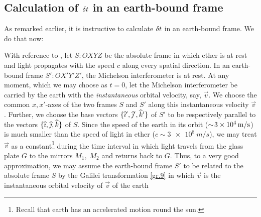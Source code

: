\subsection{Calculation of {${\delta} t$} in 
an earth-bound frame}
As remarked earlier, it is instructive to calculate ${\delta} t$ 
in an earth-bound frame. We do that now:
\begin{figure}[H]
\centering
{}
\caption{}\label{fig3.3}
\end{figure}
With reference to , let $S:OXYZ$ be the 
absolute frame in which ether is at rest and light 
propagates with the speed $c$ along every spatial direction. 
In an earth-bound frame $S':OX'Y'Z'$, the Michelson 
interferometer is at rest. At any moment, which we may 
choose as $t=0$, let the Michelson interferometer be carried 
by the earth with the \textsl{instantaneous} orbital 
velocity, say, $\vec{v}$. We choose the common $x,x'$-axes 
of the two frames $S$ and $S'$ along this  instantaneous 
velocity $\vec{v}$. Further, we choose the base vectors 
$\{{\widehat{\imath}}',{\widehat{\jmath}}',{\widehat{k}}'\}$ of $S'$ to be respectively parallel 
to the vectors $\{ {\widehat{\imath}},{\widehat{\jmath}},{\widehat{k}} \}$ of $S$. Since the 
speed of the earth in its orbit ($\sim \negthinspace 
\SI{3e4}{m/s}$) is much smaller than the speed of light in 
ether ($c \sim \SI{3e8}{m/s}$), we may treat
$\vec{v}$ as a constant\footnote{Recall that earth has an 
accelerated motion round the sun.} during  the time 
interval in which light travels from the glass plate $G$ to 
the mirrors $M_1,\; M_2$ and returns back to $G$. Thus, to a 
very good approximation, we may assume the earth-bound frame 
$S'$ to be related to the absolute frame $S$ by the Galilei 
transformation \eqref{gr.9} in which $\vec{v}$ is the 
instantaneous orbital velocity of $\vec{v}$ of the earth 

